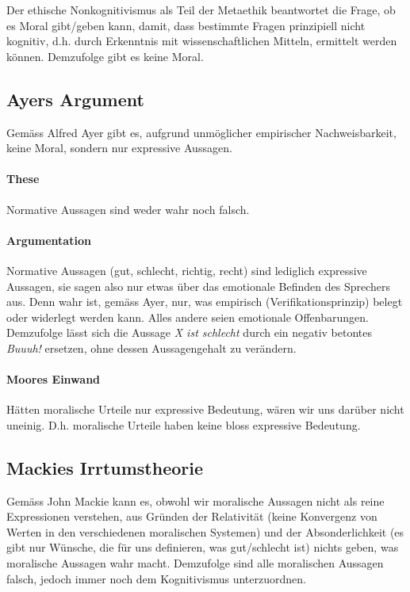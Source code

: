 \documentclass[../main.tex]{subfiles}
\begin{document}
\begin{warningbox}
Der ethische Nonkognitivismus als Teil der Metaethik beantwortet die Frage, ob es Moral gibt/geben kann, damit, dass bestimmte Fragen prinzipiell nicht kognitiv, d.h. durch Erkenntnis mit wissenschaftlichen Mitteln, ermittelt werden können. Demzufolge gibt es keine Moral.
\end{warningbox}

\subsection{Ayers Argument}
\begin{warningbox}
Gemäss Alfred Ayer gibt es, aufgrund unmöglicher empirischer Nachweisbarkeit, keine Moral, sondern nur expressive Aussagen.
\end{warningbox}
\paragraph{These} Normative Aussagen sind weder wahr noch falsch. 
\paragraph{Argumentation}
Normative Aussagen (gut, schlecht, richtig, recht) sind lediglich expressive Aussagen, sie sagen also nur etwas über das emotionale Befinden des Sprechers aus. Denn wahr ist, gemäss Ayer, nur, was empirisch (Verifikationsprinzip) belegt oder widerlegt werden kann. Alles andere seien emotionale Offenbarungen. Demzufolge lässt sich die Aussage \textit{X ist schlecht} durch ein negativ betontes \textit{Buuuh!} ersetzen, ohne dessen Aussagengehalt zu verändern.


\paragraph{Moores Einwand}
Hätten moralische Urteile nur expressive Bedeutung, wären wir uns darüber nicht uneinig. D.h. moralische Urteile haben keine bloss expressive Bedeutung. 

\subsection{Mackies Irrtumstheorie}
\begin{warningbox}
Gemäss John Mackie kann es, obwohl wir moralische Aussagen nicht als reine Expressionen verstehen, aus Gründen der Relativität (keine Konvergenz von Werten in den verschiedenen moralischen Systemen) und der Absonderlichkeit (es gibt nur Wünsche, die für uns definieren, was gut/schlecht ist) nichts geben, was moralische Aussagen wahr macht. Demzufolge sind alle moralischen Aussagen falsch, jedoch immer noch dem Kognitivismus unterzuordnen.
\end{warningbox}
\end{document}
